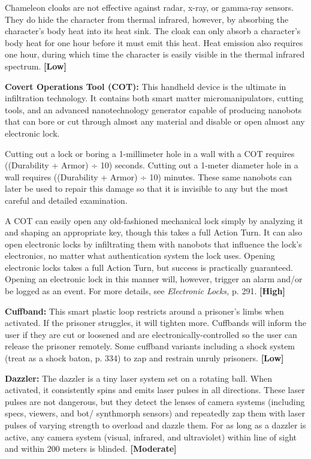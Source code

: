 Chameleon cloaks are not effective against radar, 
x-ray, or gamma-ray sensors. They do hide the character
from thermal infrared, however, by absorbing
the character's body heat into its heat sink. The cloak 
can only absorb a character's body heat for one hour 
before it must emit this heat. Heat emission also requires
one hour, during which time the character is
easily visible in the thermal infrared spectrum. \textbf{[Low]}

\textbf{Covert Operations Tool (COT): }This handheld 
device is the ultimate in infiltration technology. It contains
both smart matter micromanipulators, cutting
tools, and an advanced nanotechnology generator 
capable of producing nanobots that can bore or cut 
through almost any material and disable or open 
almost any electronic lock.

Cutting out a lock or boring a 1-millimeter hole in 
a wall with a COT requires ((Durability + Armor) ÷ 
10) seconds. Cutting out a 1-meter diameter hole in 
a wall requires ((Durability + Armor) ÷ 10) minutes. 
These same nanobots can later be used to repair this 
damage so that it is invisible to any but the most careful
and detailed examination.

A COT can easily open any old-fashioned mechanical
lock simply by analyzing it and shaping an appropriate
key, though this takes a full Action Turn.
It can also open electronic locks by infiltrating them 
with nanobots that influence the lock's electronics, 
no matter what authentication system the lock uses. 
Opening electronic locks takes a full Action Turn, but 
success is practically guaranteed. Opening an electronic
lock in this manner will, however, trigger an
alarm and/or be logged as an event. For more details, 
see \textit{Electronic Locks,} p. 291. \textbf{[High]}

\textbf{Cuffband:} This smart plastic loop restricts around 
a prisoner's limbs when activated. If the prisoner 
struggles, it will tighten more. Cuffbands will inform 
the user if they are cut or loosened and are electronically-controlled
so the user can release the prisoner
remotely. Some cuffband variants including a shock 
system (treat as a shock baton, p. 334) to zap and 
restrain unruly prisoners. \textbf{[Low]}

\textbf{Dazzler:} The dazzler is a tiny laser system set on 
a rotating ball. When activated, it consistently spins 
and emits laser pulses in all directions. These laser 
pulses are not dangerous, but they detect the lenses 
of camera systems (including specs, viewers, and bot/
synthmorph sensors) and repeatedly zap them with 
laser pulses of varying strength to overload and dazzle 
them. For as long as a dazzler is active, any camera 
system (visual, infrared, and ultraviolet) within line 
of sight and within 200 meters is blinded. \textbf{[Moderate]}

